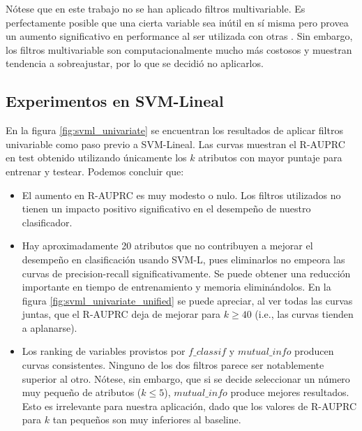 Nótese que en este trabajo no se han aplicado filtros multivariable. Es perfectamente posible que una cierta variable sea inútil en sí misma pero provea un aumento significativo en performance al ser utilizada con otras \cite{fs3}. Sin embargo, los filtros multivariable son computacionalmente mucho más costosos y muestran tendencia a sobreajustar, por lo que se decidió no aplicarlos. 

\subsection{Experimentos en SVM-Lineal}

En la figura \ref{fig:svml_univariate} se encuentran los resultados de aplicar filtros univariable como paso previo a SVM-Lineal. Las curvas muestran el R-AUPRC en test obtenido utilizando únicamente los $k$ atributos con mayor puntaje para entrenar y testear. Podemos concluir que:

\begin{itemize}
\item El aumento en R-AUPRC es muy modesto o nulo. Los filtros utilizados no tienen un impacto positivo significativo en el desempeño de nuestro clasificador.
\item Hay aproximadamente 20 atributos que no contribuyen a mejorar el desempeño en clasificación usando SVM-L, pues eliminarlos no empeora las curvas de precision-recall significativamente. Se puede obtener una reducción importante en tiempo de entrenamiento y memoria eliminándolos. En la figura \ref{fig:svml_univariate_unified} se puede apreciar, al ver todas las curvas juntas, que el R-AUPRC deja de mejorar para $k\geq40$ (i.e., las curvas tienden a aplanarse).
\item Los ranking de variables provistos por $f\_classif$ y $mutual\_info$ producen curvas consistentes. Ninguno de los dos filtros parece ser notablemente superior al otro. Nótese, sin embargo, que si se decide seleccionar un número muy pequeño de atributos ($k\leq5$), $mutual\_info$ produce mejores resultados. Esto es irrelevante para nuestra aplicación, dado que los valores de R-AUPRC para $k$ tan pequeños son muy inferiores al baseline.
\end{itemize}

